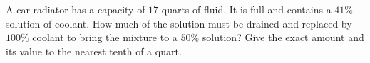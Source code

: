 A car radiator has a capacity of $17$ quarts of fluid. It is full and contains a $41\%$ solution of coolant. How much of the solution must be drained and replaced by $100\%$ coolant to bring the mixture to a $50\%$ solution? Give the exact amount and its value to the nearest tenth of a quart.
